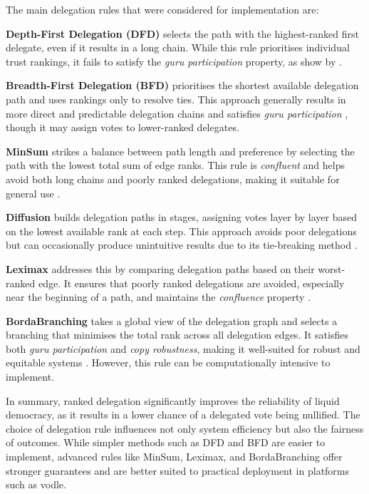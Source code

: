 The main delegation rules that were considered for implementation are:

\textbf{Depth-First Delegation (DFD)} selects the path with the highest-ranked first delegate, even if it results in a long chain. While this rule prioritises individual trust rankings, it fails to satisfy the \textit{guru participation} property, as show by \cite{kotsialou_riley_2020}.

\textbf{Breadth-First Delegation (BFD)} prioritises the shortest available delegation path and uses rankings only to resolve ties. This approach generally results in more direct and predictable delegation chains and satisfies \textit{guru participation} \citep{kotsialou_riley_2020, brill_liquid_2022}, though it may assign votes to lower-ranked delegates.

\textbf{MinSum} strikes a balance between path length and preference by selecting the path with the lowest total sum of edge ranks. This rule is \textit{confluent} and helps avoid both long chains and poorly ranked delegations, making it suitable for general use \citep{brill_liquid_2022}.

\textbf{Diffusion} builds delegation paths in stages, assigning votes layer by layer based on the lowest available rank at each step. This approach avoids poor delegations but can occasionally produce unintuitive results due to its tie-breaking method \citep{brill_liquid_2022, colley_smart_2020}.

\textbf{Leximax} addresses this by comparing delegation paths based on their worst-ranked edge. It ensures that poorly ranked delegations are avoided, especially near the beginning of a path, and maintains the \textit{confluence} property \citep{brill_liquid_2022}.

\textbf{BordaBranching} takes a global view of the delegation graph and selects a branching that minimises the total rank across all delegation edges. It satisfies both \textit{guru participation} and \textit{copy robustness}, making it well-suited for robust and equitable systems \citep{brill_liquid_2022}. However, this rule can be computationally intensive to implement.

In summary, ranked delegation significantly improves the reliability of liquid democracy, as it results in a lower chance of a delegated vote being nullified. The choice of delegation rule influences not only system efficiency but also the fairness of outcomes. While simpler methods such as DFD and BFD are easier to implement, advanced rules like MinSum, Leximax, and BordaBranching offer stronger guarantees and are better suited to practical deployment in platforms such as vodle.

